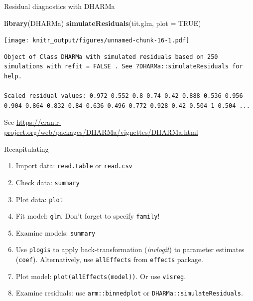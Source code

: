\documentclass[10pt,ignorenonframetext,]{beamer}
\newenvironment{Shaded}{\begin{snugshade}}{\end{snugshade}}
\newcommand{\KeywordTok}[1]{\textcolor[rgb]{0.13,0.29,0.53}{\textbf{{#1}}}}
\newcommand{\DataTypeTok}[1]{\textcolor[rgb]{0.13,0.29,0.53}{{#1}}}
\newcommand{\OtherTok}[1]{\textcolor[rgb]{0.56,0.35,0.01}{{#1}}}
\newcommand{\NormalTok}[1]{{#1}}
\begin{document}
\begin{frame}[fragile]{Residual diagnostics with DHARMa}

\begin{Shaded}
\begin{Highlighting}[]
\KeywordTok{library}\NormalTok{(DHARMa)}
\KeywordTok{simulateResiduals}\NormalTok{(tit.glm, }\DataTypeTok{plot =} \OtherTok{TRUE}\NormalTok{)}
\end{Highlighting}
\end{Shaded}

\texttt{[image: knitr\_output/figures/unnamed-chunk-16-1.pdf]}

\begin{verbatim}
Object of Class DHARMa with simulated residuals based on 250 simulations with refit = FALSE . See ?DHARMa::simulateResiduals for help. 
 
Scaled residual values: 0.972 0.552 0.8 0.74 0.42 0.888 0.536 0.956 0.904 0.864 0.832 0.84 0.636 0.496 0.772 0.928 0.42 0.504 1 0.504 ...
\end{verbatim}

See
\url{https://cran.r-project.org/web/packages/DHARMa/vignettes/DHARMa.html}

\end{frame}

\begin{frame}[fragile]{Recapitulating}

\begin{enumerate}[<+->]
\def\labelenumi{\arabic{enumi}.}
\item
  Import data: \texttt{read.table} or \texttt{read.csv}
\item
  Check data: \texttt{summary}
\item
  Plot data: \texttt{plot}
\item
  Fit model: \texttt{glm}. Don't forget to specify \texttt{family}!
\item
  Examine models: \texttt{summary}
\item
  Use \texttt{plogis} to apply back-transformation (\emph{invlogit}) to
  parameter estimates (\texttt{coef}). Alternatively, use
  \texttt{allEffects} from \texttt{effects} package.
\item
  Plot model: \texttt{plot(allEffects(model))}. Or use \texttt{visreg}.
\item
  Examine residuals: use \texttt{arm::binnedplot} or
  \texttt{DHARMa::simulateResiduals}.
\end{enumerate}

\end{frame}
\end{document}
